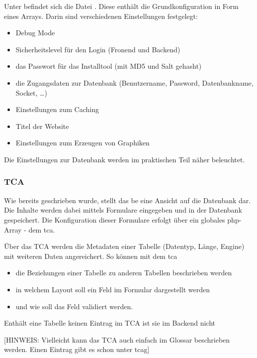 Unter  befindet sich die Datei . Diese enthält die Grundkonfiguration in Form eines Arrays. Darin sind verschiedenen Einstellungen festgelegt:
\begin{itemize}
	\item Debug Mode
	\item Sicherheitslevel für den Login (Fronend und Backend)
	\item das Passwort für das Installtool (mit MD5 und Salt gehasht)
	\item die Zugangsdaten zur Datenbank (Benutzername, Password, Datenbankname, Socket, …)
	\item Einstellungen zum Caching
	\item Titel der Website
	\item Einstellungen zum Erzeugen von Graphiken
\end{itemize}

Die Einstellungen zur Datenbank werden im praktischen Teil näher beleuchtet.

\subsubsection{TCA}

Wie bereits geschrieben wurde, stellt das \gls{be} eine Ansicht auf die Datenbank dar. Die Inhalte werden dabei mittels Formulare eingegeben und in der Datenbank gespeichert. Die Konfiguration dieser Formulare erfolgt über ein globales \gls{php}-Array - dem \gls{tca}.

Über das TCA werden die Metadaten einer Tabelle (Datentyp, Länge, Engine) mit weiteren Daten angereichert. So können mit dem \gls{tca}

\begin{itemize}
	\itemsep1pt\parskip0pt
	\item
		die Beziehungen einer Tabelle zu anderen Tabellen beschrieben werden
	\item
		in welchem Layout soll ein Feld im Formular dargestellt werden
	\item
		und wie soll das Feld validiert werden.
\end{itemize}

Enthält eine Tabelle keinen Eintrag im TCA ist sie im Backend nicht %

[HINWEIS: Vielleicht kann das TCA auch einfach im Glossar beschrieben werden. Einen Eintrag gibt es schon unter tcag]

